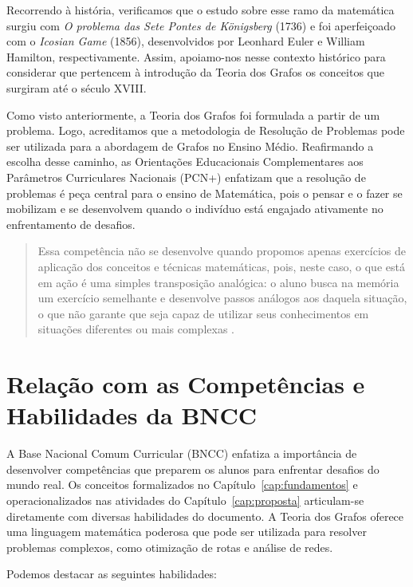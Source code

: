 \documentclass[
  12pt,
  oneside,
  a4paper,
  english,
  brazilian
  ]{abntex2}
\theoremstyle{definition}
\begin{document}
Recorrendo à história, verificamos que o estudo sobre esse ramo da matemática surgiu com \textit{O problema das Sete Pontes de Königsberg} (1736) e foi aperfeiçoado com o \textit{Icosian Game} (1856), desenvolvidos por Leonhard Euler e William Hamilton, respectivamente. Assim, apoiamo-nos nesse contexto histórico para considerar que pertencem à introdução da Teoria dos Grafos os conceitos que surgiram até o século XVIII.

Como visto anteriormente, a Teoria dos Grafos foi formulada a partir de um problema. Logo, acreditamos que a metodologia de Resolução de Problemas pode ser utilizada para a abordagem de Grafos no Ensino Médio. Reafirmando a escolha desse caminho, as Orientações Educacionais Complementares aos Parâmetros Curriculares Nacionais (PCN+) enfatizam que a resolução de problemas é peça central para o ensino de Matemática, pois o pensar e o fazer se mobilizam e se desenvolvem quando o indivíduo está engajado ativamente no enfrentamento de desafios.

\begin{quote}
\small
Essa competência não se desenvolve quando propomos apenas exercícios de aplicação dos conceitos e técnicas matemáticas, pois, neste caso, o que está em ação é uma simples transposição analógica: o aluno busca na memória um exercício semelhante e desenvolve passos análogos aos daquela situação, o que não garante que seja capaz de utilizar seus conhecimentos em situações diferentes ou mais complexas \cite{brasil2002}.
\end{quote}

\section{Relação com as Competências e Habilidades da BNCC}

A Base Nacional Comum Curricular (BNCC) \cite{brasil2018} enfatiza a importância de desenvolver competências que preparem os alunos para enfrentar desafios do mundo real. Os conceitos formalizados no Capítulo~\ref{cap:fundamentos} e operacionalizados nas atividades do Capítulo~\ref{cap:proposta} articulam-se diretamente com diversas habilidades do documento. A Teoria dos Grafos oferece uma linguagem matemática poderosa que pode ser utilizada para resolver problemas complexos, como otimização de rotas e análise de redes.

Podemos destacar as seguintes habilidades:
\end{document}
